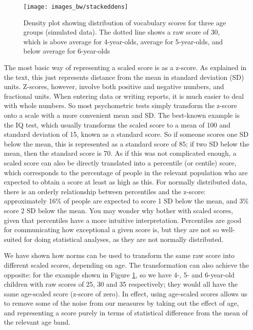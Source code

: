 \documentclass{krantz}
\begin{document}
\begin{figure}
\texttt{[image: images\_bw/stackeddens]} \caption{Density plot showing distribution of vocabulary scores for three age groups (simulated data). The dotted line shows a raw score of 30, which is above average for 4-year-olds, average for 5-year-olds, and below average for 6-year-olds}\label{fig:normsplot}
\end{figure}

\begin{tcolorbox}[enhanced,colback=Black!5!lightgray,colframe=black!75!black,coltitle=white,title=Scaled scores and percentiles]\label{box:scaledscores}
The most basic way of representing a scaled score is as a z-score. As explained in the text, this just represents distance from the mean in standard deviation (SD) units. Z-scores, however, involve both positive and negative numbers, and fractional units. When entering data or writing reports, it is much easier to deal with whole numbers. So most psychometric tests simply transform the z-score onto a scale with a more convenient mean and SD. The best-known example is the IQ test, which usually transforms the scaled score to a mean of 100 and standard deviation of 15, known as a standard score. So if someone scores one SD below the mean, this is represented as a standard score of 85; if two SD below the mean, then the standard score is 70.  
As if this was not complicated enough, a scaled score can also be directly translated into a percentile (or centile) score, which corresponds to the percentage of people in the relevant population who are expected to obtain a score at least as high as this. For normally distributed data, there is an orderly relationship between percentiles and the z-score: approximately 16\% of people are expected to score 1 SD below the mean, and 3\% score 2 SD below the mean.  
You may wonder why bother with scaled scores, given that percentiles have a more intuitive interpretation. Percentiles are good for communicating how exceptional a given score is, but they are not so well-suited for doing statistical analyses, as they are not normally distributed.

\end{tcolorbox}

We have shown how norms can be used to transform the same raw score into different scaled scores, depending on age. The transformation can also achieve the opposite: for the example shown in Figure \ref{fig:normsplot}, so we have 4-, 5- and 6-year-old children with raw scores of 25, 30 and 35 respectively; they would all have the same age-scaled score (z-score of zero). In effect, using age-scaled scores allows us to remove some of the noise from our measures by taking out the effect of age, and representing a score purely in terms of statistical difference from the mean of the relevant age band.
\end{document}
